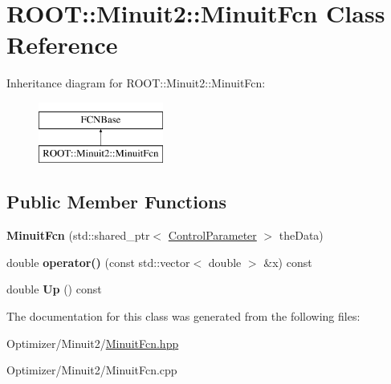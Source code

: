 \hypertarget{class_r_o_o_t_1_1_minuit2_1_1_minuit_fcn}{\section{R\-O\-O\-T\-:\-:Minuit2\-:\-:Minuit\-Fcn Class Reference}
\label{class_r_o_o_t_1_1_minuit2_1_1_minuit_fcn}
}
Inheritance diagram for R\-O\-O\-T\-:\-:Minuit2\-:\-:Minuit\-Fcn\-:\begin{figure}[H]
\begin{center}
\leavevmode
\includegraphics[height=2.000000cm]{class_r_o_o_t_1_1_minuit2_1_1_minuit_fcn}
\end{center}
\end{figure}
\subsection*{Public Member Functions}
\begin{DoxyCompactItemize}
\item 
\hypertarget{class_r_o_o_t_1_1_minuit2_1_1_minuit_fcn_a387fcbf6811bbd6e6ba97e10b1df4f10}{{\bfseries Minuit\-Fcn} (std\-::shared\-\_\-ptr$<$ \hyperlink{class_control_parameter}{Control\-Parameter} $>$ the\-Data)}\label{class_r_o_o_t_1_1_minuit2_1_1_minuit_fcn_a387fcbf6811bbd6e6ba97e10b1df4f10}

\item 
\hypertarget{class_r_o_o_t_1_1_minuit2_1_1_minuit_fcn_adb9dc1866f4f718becb2e606e7e4de6b}{double {\bfseries operator()} (const std\-::vector$<$ double $>$ \&x) const }\label{class_r_o_o_t_1_1_minuit2_1_1_minuit_fcn_adb9dc1866f4f718becb2e606e7e4de6b}

\item 
\hypertarget{class_r_o_o_t_1_1_minuit2_1_1_minuit_fcn_a66f3013fdbc34077352fe8add6620d60}{double {\bfseries Up} () const }\label{class_r_o_o_t_1_1_minuit2_1_1_minuit_fcn_a66f3013fdbc34077352fe8add6620d60}

\end{DoxyCompactItemize}


The documentation for this class was generated from the following files\-:\begin{DoxyCompactItemize}
\item 
Optimizer/\-Minuit2/\hyperlink{_minuit_fcn_8hpp}{Minuit\-Fcn.\-hpp}\item 
Optimizer/\-Minuit2/Minuit\-Fcn.\-cpp\end{DoxyCompactItemize}
